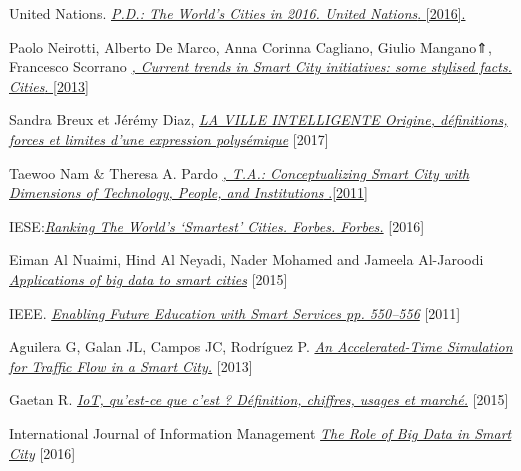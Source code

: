 \documentclass[french, a4paper, 12pt]{report}
\begin{document}
% 
%  
{} 
\begin{thebibliography}{9}
United Nations. \href{https://www.un.org/en/development/desa/population/publications/pdf/urbanization/the_worlds_cities_in_2016_data_booklet.pdf}{\emph{P.D.: The World’s Cities in 2016. United Nations}. [2016].} 

 Paolo Neirotti, Alberto De Marco, Anna Corinna Cagliano, Giulio Mangano⇑, Francesco Scorrano \href{https://www.researchgate.net/publication/260015335_Current_trends_in_Smart_City_initiatives_Some_stylised_facts}{\emph{, Current trends in Smart City initiatives: some stylised facts. Cities}. [2013]} 

  Sandra Breux et Jérémy Diaz, \href{http://espace.inrs.ca/4917/1/Rapport-LaVilleIntelligente.pdf}{\emph{LA VILLE INTELLIGENTE Origine, définitions, forces et limites d’une expression polysémique}} [2017]

 Taewoo Nam \& Theresa A. Pardo \href{https://inta-aivn.org/images/cc/Urbanism/background\%20documents/dgo_2011_smartcity.pdf}{\emph{, T.A.: Conceptualizing Smart City with Dimensions of Technology, People, and Institutions }.[2011]} 


IESE:\href{https://www.forbes.com/sites/iese/2019/05/21/these-are-the-smartest-cities-in-the-world-for-2019/}{\emph{Ranking The World’s ‘Smartest’ Cities. Forbes. Forbes.}} [2016]

Eiman Al Nuaimi, Hind Al Neyadi, Nader Mohamed and Jameela Al-Jaroodi \href{https://jisajournal.springeropen.com/articles/10.1186/s13174-015-0041-5}{\emph{Applications of big data to smart cities}} [2015]

IEEE. \href{https://ieeexplore.ieee.org/abstract/document/5958132}{\emph{Enabling Future Education with Smart Services pp. 550–556}} [2011]

Aguilera G, Galan JL, Campos JC, Rodríguez P. \href{}{\emph{An Accelerated-Time Simulation for Traffic Flow in a Smart City.}} [2013]

Gaetan R. \href{https://www.objetconnecte.com/iot-definition-chiffres-usages-marches/}{\emph{IoT, qu’est-ce que c’est ? Définition, chiffres, usages et marché.}} [2015]


International Journal of Information Management \href{https://www.researchgate.net/publication/301803005_The_Role_of_Big_Data_in_Smart_City}{\emph{The Role of Big Data in Smart City}} [2016]


\end{thebibliography}
\end{document}
